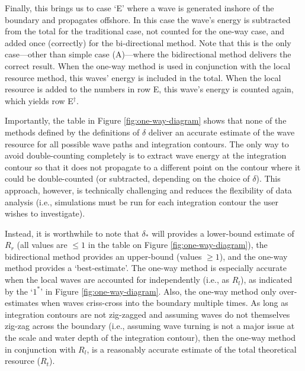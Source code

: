 Finally, this brings us to case `E' where a wave is generated inshore of the boundary and propagates offshore. In this case the wave's energy is subtracted from the total for the traditional case, not counted for the one-way case, and added once (correctly) for the bi-directional method. Note that this is the only case—other than simple case (A)—where the bidirectional method delivers the correct result. When the one-way method is used in conjunction with the local resource method, this waves' energy is included in the total.
When the local resource is added to the numbers in row E, this wave's energy is counted again, which yields row E$^\dagger$.

Importantly, the table in Figure \ref{fig:one-way-diagram} shows that none of the methods defined by the definitions of $\delta$ deliver an accurate estimate of the wave resource for all possible wave paths and integration contours. The only way to avoid double-counting completely is to extract wave energy at the integration contour so that it does not propagate to a different point on the contour where it could be double-counted (or subtracted, depending on the choice of $\delta$). This approach, however, is technically challenging and reduces the flexibility of data analysis (i.e., simulations must be run for each integration contour the user wishes to investigate).

Instead, it is worthwhile to note that $\delta_*$ will provides a lower-bound estimate of $R_r$ (all values are $\le 1$ in the table on Figure \ref{fig:one-way-diagram}), the bidirectional method provides an upper-bound (values $\ge 1$), and the one-way method provides a `best-estimate'. The one-way method is especially accurate when the local waves are accounted for independently (i.e., as $R_l$), as indicated by the `$1^*$' in Figure \ref{fig:one-way-diagram}. Also, the one-way method only over-estimates when waves criss-cross into the boundary multiple times. As long as integration contours are not zig-zagged and assuming waves do not themselves zig-zag across the boundary (i.e., assuming wave turning is not a major issue at the scale and water depth of the integration contour), then the one-way method in conjunction with $R_l$, is a reasonably accurate estimate of the total theoretical resource ($R_t$).

